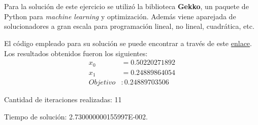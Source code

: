 \documentclass[titlepage, 11pt]{scrartcl}
\begin{document}
	\section{}{
		Para la soluci\'on de este ejercicio se utiliz\'o la biblioteca \textbf{Gekko}, un paquete de Python para \textit{machine learning} y optimizaci\'on. Adem\'as viene aparejada de solucionadores a gran escala para programaci\'on lineal, no lineal, cuadr\'atica, etc.
		
		El c\'odigo empleado para su soluci\'on se puede encontrar a trav\'es de este \href{lab1_ex3gekko.py}{enlace}. Los resultados obtenidos fueron los siguientes:
		\begin{align*}
			x_0 &= 0.50220271892\\
			x_1 &= 0.24889864054\\
			Objetivo &: 0.24889703506 
		\end{align*}
		
		Cantidad de iteraciones realizadas: 11
		
		Tiempo de soluci\'on: 2.730000000155997E-002.
	}
        
\end{document}
